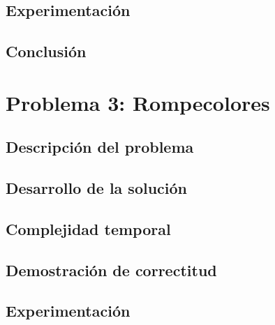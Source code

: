 \documentclass[a4paper, 10pt, twoside]{article}
\begin{document}
\subsection{Experimentación}
\label{problema2-experimentacion}


\subsection{Conclusión}
\label{problema2-resultados}


\newpage



\section{Problema 3: Rompecolores}

\subsection{Descripción del problema}
\label{problema3-descripcion}


\subsection{Desarrollo de la solución}
\label{problema3-desarrollo}


\subsection{Complejidad temporal}
\label{problema3-complejidad}


\subsection{Demostración de correctitud}
\label{problema3-demostracion}


\subsection{Experimentación}
\label{problema3-experimentacion}

\end{document}

